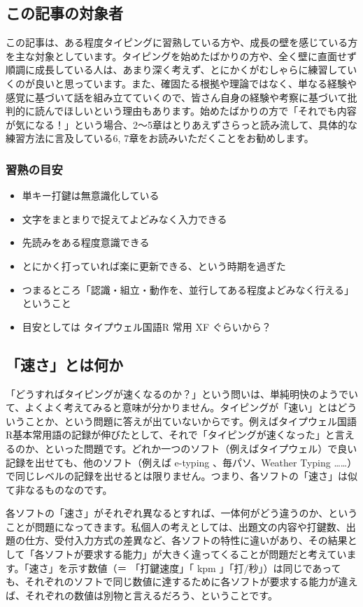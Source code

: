 \subsection{この記事の対象者}

この記事は、ある程度タイピングに習熟している方や、成長の壁を感じている方を主な対象としています。タイピングを始めたばかりの方や、全く壁に直面せず順調に成長している人は、あまり深く考えず、とにかくがむしゃらに練習していくのが良いと思っています。また、確固たる根拠や理論ではなく、単なる経験や感覚に基づいて話を組み立てていくので、皆さん自身の経験や考察に基づいて批判的に読んでほしいという理由もあります。始めたばかりの方で「それでも内容が気になる！」という場合、2～5章はとりあえずさらっと読み流して、具体的な練習方法に言及している6, 7章をお読みいただくことをお勧めします。

\subsubsection*{習熟の目安}
\begin{itemize}
 \item 単キー打鍵は無意識化している
 \item 文字をまとまりで捉えてよどみなく入力できる
 \item 先読みをある程度意識できる
 \item とにかく打っていれば楽に更新できる、という時期を過ぎた
 \item つまるところ「認識・組立・動作を、並行してある程度よどみなく行える」ということ
 \item 目安としては タイプウェル国語R 常用 XF ぐらいから？
\end{itemize}

\subsection{「速さ」とは何か}

「どうすればタイピングが速くなるのか？」という問いは、単純明快のようでいて、よくよく考えてみると意味が分かりません。タイピングが「速い」とはどういうことか、という問題に答えが出ていないからです。例えばタイプウェル国語R基本常用語の記録が伸びたとして、それで「タイピングが速くなった」と言えるのか、といった問題です。どれか一つのソフト（例えばタイプウェル）で良い記録を出せても、他のソフト（例えば e-typing 、毎パソ、Weather Typing ……）で同じレベルの記録を出せるとは限りません。つまり、各ソフトの「速さ」は似て非なるものなのです。

各ソフトの「速さ」がそれぞれ異なるとすれば、一体何がどう違うのか、ということが問題になってきます。私個人の考えとしては、出題文の内容や打鍵数、出題の仕方、受付入力方式の差異など、各ソフトの特性に違いがあり、その結果として「各ソフトが要求する能力」が大きく違ってくることが問題だと考えています。「速さ」を示す数値（＝ 「打鍵速度」「 kpm 」「打/秒」）は同じであっても、それぞれのソフトで同じ数値に達するために各ソフトが要求する能力が違えば、それぞれの数値は別物と言えるだろう、ということです。

